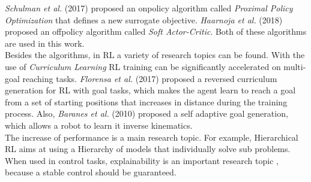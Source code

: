 \emph{Schulman et al.} (2017) \cite{schulman2017proximal} proposed an onpolicy
algorithm called \emph{Proximal Policy Optimization} that defines a new surrogate objective.
\emph{Haarnoja et al.} (2018) \cite{haarnoja2018soft} proposed an offpolicy
algorithm called \emph{Soft Actor-Critic}. Both of these algorithms are used 
in this work.\\
Besides the algorithms, in RL a variety of research topics can be found.
With the use of \emph{Curriculum Learning} \cite{9207427} RL training can 
be significantly accelerated on multi-goal reaching tasks.
\emph{Florensa et al.} (2017) \cite{pmlr-v78-florensa17a} proposed a reversed
curriculum generation for RL with goal tasks, which makes the agent learn to reach a goal 
from a set of starting positions that increases in distance during the training process. 
Also, \emph{Baranes et al.} (2010) \cite{5651385} proposed a self adaptive goal generation, 
which allows a robot to learn it inverse kinematics.\\
The increase of performance is a main research topic. 
For example, Hierarchical RL \cite{botvinick2012hierarchical} aims at 
using a Hierarchy of models that individually solve sub problems.
When used in control tasks, explainability is an important research topic \cite{heuillet2021explainability},
because a stable control should be guaranteed.

